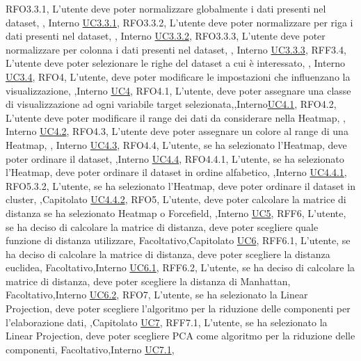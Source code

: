 {    {RFO3.3.1, L'utente deve poter normalizzare globalmente i dati presenti nel dataset, \obb, Interno \noexpand\hyperref[uc3.3.1]{UC3.3.1}},
    {RFO3.3.2, L'utente deve poter normalizzare per riga i dati presenti nel dataset, \obb, Interno \noexpand\hyperref[uc3.3.2]{UC3.3.2}},
    {RFO3.3.3, L'utente deve poter normalizzare per colonna i dati presenti nel dataset, \obb, Interno \noexpand\hyperref[uc3.3.3]{UC3.3.3}},
    {RFF3.4, L'utente deve poter selezionare le righe del dataset a cui è interessato, \obb, Interno \noexpand\hyperref[uc3.4]{UC3.4}},
    {RFO4, L'utente{,} deve poter modificare le impostazioni che influenzano la visualizzazione, \obb,Interno \noexpand\hyperref[uc4]{UC4}},
    {RFO4.1, L'utente{,} deve poter assegnare una classe di visualizzazione ad ogni variabile target selezionata,\obb,Interno\noexpand\hyperref[uc4.1]{UC4.1}},
    {RFO4.2, L'utente deve poter modificare il range dei dati da considerare nella Heatmap, \obb, Interno \noexpand\hyperref[uc4.2]{UC4.2}},
    {RFO4.3, L'utente deve poter assegnare un colore al range di una Heatmap, \obb, Interno \noexpand\hyperref[uc4.3]{UC4.3}},
     {RFO4.4, L'utente{,} se ha selezionato l'Heatmap{,} deve poter ordinare il dataset, \obb,Interno \noexpand\hyperref[uc4.4]{UC4.4}},
    {RFO4.4.1, L'utente{,} se ha selezionato l'Heatmap{,} deve poter ordinare il dataset in ordine alfabetico, \obb,Interno \noexpand\hyperref[uc4.4.1]{UC4.4.1}},
    {RFO5.3.2, L'utente{,} se ha selezionato l'Heatmap{,} deve poter ordinare il dataset in cluster, \obb,Capitolato \noexpand\hyperref[uc4.4.2]{UC4.4.2}},
    {RFO5, L'utente{,} deve poter calcolare la matrice di distanza se ha selezionato Heatmap o Forcefield, \obb,Interno \noexpand\hyperref[uc5]{UC5}},
    {RFF6, L'utente{,} se ha deciso di calcolare la matrice di distanza{,} deve poter scegliere quale funzione di distanza utilizzare, Facoltativo,Capitolato \noexpand\hyperref[uc6]{UC6}},
    {RFF6.1, L'utente{,} se ha deciso di calcolare la matrice di distanza{,} deve poter scegliere la distanza euclidea, Facoltativo,Interno \noexpand\hyperref[uc6.1]{UC6.1}},
    {RFF6.2, L'utente{,} se ha deciso di calcolare la matrice di distanza{,} deve poter scegliere la distanza di Manhattan, Facoltativo,Interno \noexpand\hyperref[uc6.2]{UC6.2}},
    {RFO7, L'utente{,} se ha selezionato la Linear Projection{,} deve poter scegliere l'algoritmo per la riduzione delle componenti per l'elaborazione dati, \obb,Capitolato \noexpand\hyperref[uc7]{UC7}},
    {RFF7.1, L'utente{,} se ha selezionato la Linear Projection{,} deve poter scegliere PCA come algoritmo per la riduzione delle componenti, Facoltativo,Interno \noexpand\hyperref[uc7.1]{UC7.1}},
}
